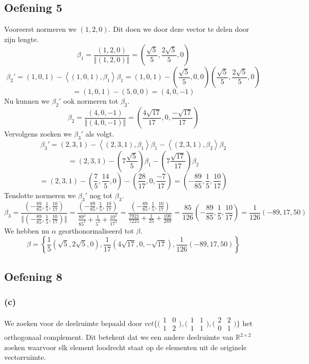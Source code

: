 \documentclass[lineaire_algebra_oplossingen.tex]{subfiles}
\begin{document}
\subsection{Oefening 5}
Vooreerst normeren we $(1,2,0)$. Dit doen we door deze vector te delen door zijn lengte.
\[
\beta_1 = \frac{(1,2,0)}{\Vert(1,2,0)\Vert}
= \left(\frac{\sqrt{5}}{5},\frac{2\sqrt{5}}{5},0\right)
\]
\[
\beta_2' = (1,0,1) - \left\langle (1,0,1),\beta_1 \right\rangle \beta_1
= (1,0,1) - \left(\frac{\sqrt{5}}{5},0,0\right)\left(\frac{\sqrt{5}}{5},\frac{2\sqrt{5}}{5},0\right)
\]
\[
=(1,0,1) - (5,0,0) = (4,0,-1)
\]
Nu kunnen we $\beta_2'$ ook normeren tot $\beta_2$.
\[
\beta_2 = \frac{(4,0,-1)}{\Vert (4,0,-1)\Vert}
= \left( \frac{4\sqrt{17}}{17},0,\frac{-\sqrt{17}}{17} \right)
\]
Vervolgens zoeken we $\beta_3'$ als volgt.
\[
\beta_3'
= (2,3,1)
- \left\langle (2,3,1),\beta_1\right\rangle\beta_1
- \left\langle (2,3,1),\beta_2\right\rangle\beta_2
\]
\[
= (2,3,1)
- \left(7\frac{\sqrt{5}}{5}\right)  \beta_1
- \left(7\frac{\sqrt{17}}{17} \right)  \beta_2
\]
\[
=(2,3,1)
- \left(\frac{7}{5},\frac{14}{5},0\right)
- \left( \frac{28}{17},0,\frac{-7}{17} \right)
= 
\left(-\frac{89}{85},\frac{1}{5},\frac{10}{17}\right)
\]
Tenslotte normeren we $\beta_3'$ nog tot $\beta_3$.
\[
\beta_3 = 
\frac{\left(-\frac{89}{85},\frac{1}{5},\frac{10}{17}\right)}
{\Vert\left(-\frac{89}{85},\frac{1}{5},\frac{10}{17}\right)\Vert}
= 
\frac{\left(-\frac{89}{85},\frac{1}{5},\frac{10}{17}\right)}
{\frac{89^2}{85^2}+\frac{1}{5^2}+\frac{10^2}{17^2}}
=
\frac{\left(-\frac{89}{85},\frac{1}{5},\frac{10}{17}\right)}
{\frac{7921}{7225}+\frac{1}{25}+\frac{100}{289}}
=
\frac{85}{126}
\left(-\frac{89}{85},\frac{1}{5},\frac{10}{17}\right)
=
\frac{1}{126}
\left(-89,17,50\right)
\]
We hebben nu $\alpha$ georthonormaliseerd tot $\beta$.
\[
\beta
=
\left\{
\frac{1}{5}
\left(\sqrt{5},2\sqrt{5},0\right)
,
\frac{1}{17}
\left( 4\sqrt{17},0,-\sqrt{17} \right)
,
\frac{1}{126}
\left(-89,17,50\right)
\right\}
\]


\subsection{Oefening 8}
\subsubsection*{(c)}
We zoeken voor de deelruimte bepaald door $vct\{\bigl(\begin{smallmatrix}
1 & 0 \\
1 & 2
\end{smallmatrix}\bigr),\bigl(\begin{smallmatrix}
1 & 1 \\
1 & 1
\end{smallmatrix}\bigr),\bigl(\begin{smallmatrix}
2 & 2 \\
0 & 1
\end{smallmatrix}\bigr)\}$  het orthogonaal complement. Dit betekent dat we een andere deelruimte van $\mathbb{R}^{2\times2}$ zoeken waarvoor elk element loodrecht staat op de elementen uit de originele vectorruimte.
\end{document}
